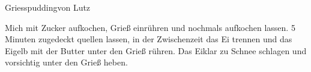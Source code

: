 \begin{recipe}{Griesspudding}{von Lutz}
  \label{Griesspudding}
  \inglist

  \steps

  Mich mit Zucker aufkochen, Grieß einrühren und nochmals aufkochen lassen. 5
  Minuten zugedeckt quellen lassen, in der Zwischenzeit das Ei trennen und das
  Eigelb mit der Butter unter den Grieß rühren. Das Eiklar zu Schnee schlagen
  und vorsichtig unter den Grieß heben.

\end{recipe}
